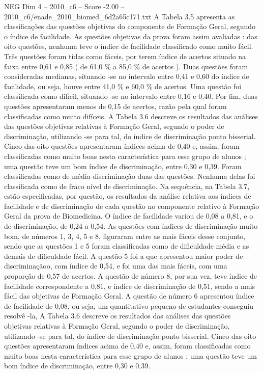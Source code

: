 \begin{textsample}{NEG Dim 4 – 2010\_c6 – Score -2.00 – 2010\_c6/enade\_2010\_biomed\_6d2a65c171.txt}
A Tabela 3.5 apresenta as classificações das questões objetivas do componente de Formação Geral, segundo o índice de facilidade.
As questões objetivas da prova foram assim avaliadas : das oito questões, nenhuma teve o índice de facilidade classificado como muito fácil.
Três questões foram tidas como fáceis, por terem índice de acertos situado na faixa entre 0,61 e 0,85 ( de 61,0 \% a 85,0 \% de acertos ).
Duas questões foram consideradas medianas, situando -se no intervalo entre 0,41 e 0,60 do índice de facilidade, ou seja, houve entre 41,0 \% e 60,0 \% de acertos.
Uma questão foi classificada como difícil, situando -se no intervalo entre 0,16 e 0,40.
Por fim, duas questões apresentaram menos de 0,15 de acertos, razão pela qual foram classificadas como muito difíceis.
A Tabela 3.6 descreve os resultados das análises das questões objetivas relativas à Formação Geral, segundo o poder de discriminação, utilizando -se para tal, do índice de discriminação ponto bisserial.
Cinco das oito questões apresentaram índices acima de 0,40 e, assim, foram classificadas como muito boas nesta característica para esse grupo de alunos ; uma questão teve um bom índice de discriminação, entre 0,30 e 0,39.
Foram classificadas como de média discriminação duas das questões.
Nenhuma delas foi classificada como de fraco nível de discriminação.
Na sequência, na Tabela 3.7, estão especificadas, por questão, os resultados da análise relativa aos índices de facilidade e de discriminação de cada questão no componente relativo à Formação Geral da prova de Biomedicina.
O índice de facilidade variou de 0,08 a 0,81, e o de discriminação, de 0,24 a 0,54.
As questões com índices de discriminação muito bom, de números 1, 3, 4, 5 e 8, figuraram entre as mais fáceis desse conjunto, sendo que as questões 1 e 5 foram classificadas como de dificuldade média e as demais de dificuldade fácil.
A questão 5 foi a que apresentou maior poder de discriminaçãoo, com índice de 0,54, e foi uma das mais fáceis, com uma proporção de 0,57 de acertos.
A questão de número 8, por sua vez, teve índice de facilidade correspondente a 0,81, e índice de discriminação de 0,51, sendo a mais fácil das objetivas de Formação Geral.
A questão de número 6 apresentou índice de facilidade de 0,08, ou seja, um quantitativo pequeno de estudantes conseguiu resolvê -la, A Tabela 3.6 descreve os resultados das análises das questões objetivas relativas à Formação Geral, segundo o poder de discriminação, utilizando -se para tal, do índice de discriminação ponto bisserial.
Cinco das oito questões apresentaram índices acima de 0,40 e, assim, foram classificadas como muito boas nesta característica para esse grupo de alunos ; uma questão teve um bom índice de discriminação, entre 0,30 e 0,39.

\end{textsample}
